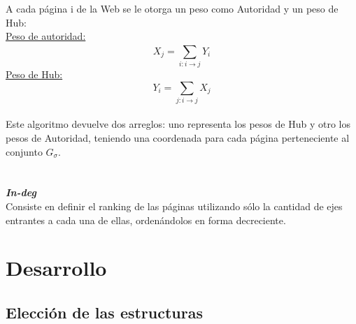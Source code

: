 \documentclass[a4paper]{article}
\begin{document}
\indent A cada p\'agina i de la Web se le otorga un peso como Autoridad y un peso de Hub: \\
\indent \underline{Peso de autoridad:}
\[
	X_j = \sum_{i: i\rightarrow j}^{} Y_i
\]
\indent \underline{Peso de Hub:}
\[
Y_i = \sum_{j: i\rightarrow j} X_j
\]
\\
Este algoritmo devuelve dos arreglos: uno representa los pesos de Hub y otro los pesos de Autoridad, teniendo una coordenada para cada p\'agina perteneciente al conjunto $G_\sigma$.\\
\\
\\
\indent \indent \emph{\textbf{In-deg}} \\
\indent Consiste en definir el ranking de las p\'aginas utilizando s\'olo la cantidad de ejes entrantes a cada una de ellas, orden\'andolos en forma decreciente.\\

\newpage
\section{Desarrollo}
\subsection{Elecci\'on de las estructuras}
\end{document}
